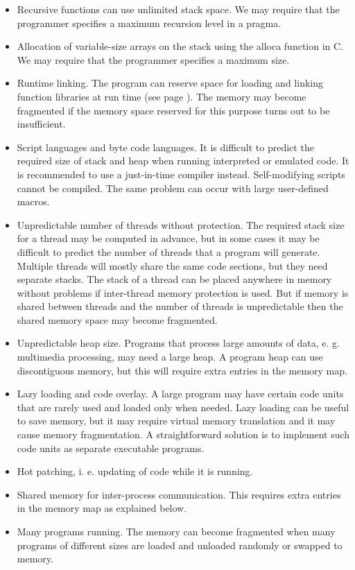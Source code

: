\documentclass[forwardcom.tex]{subfiles}
\begin{document}
\begin{itemize}
\item Recursive functions can use unlimited stack space. We may require that the programmer specifies a maximum recursion level in a pragma.

\item Allocation of variable-size arrays on the stack using the alloca function in C. We may require that the programmer specifies a maximum size. 

\item Runtime linking. The program can reserve space for loading and linking function libraries at run time (see page \pageref{runtimeLinking}). The memory may become fragmented if the memory space reserved for this purpose turns out to be insufficient.

\item Script languages and byte code languages. It is difficult to predict the required size of stack and heap when running interpreted or emulated code. It is recommended to use a just-in-time compiler instead. Self-modifying scripts cannot be compiled. The same problem can occur with large user-defined macros.

\item Unpredictable number of threads without protection. The required stack size for a thread may be computed in advance, but in some cases it may be difficult to predict the number of threads that a program will generate. Multiple threads will mostly share the same code sections, but they need separate stacks. The stack of a thread can be placed anywhere in memory without problems if inter-thread memory protection is used. But if memory is shared between threads and the number of threads is unpredictable then the shared 
memory space may become fragmented. 

\item Unpredictable heap size. Programs that process large amounts of data, e. g. multimedia processing, may need a large heap. A program heap can use discontiguous memory, but this will require extra entries in the memory map. 

\item Lazy loading and code overlay. A large program may have certain code units that are rarely used and loaded only when needed. Lazy loading can be useful to save memory, but it may require virtual memory translation and it may cause memory fragmentation. A straightforward solution is to implement such code units as separate executable programs. 

\item Hot patching, i. e. updating of code while it is running. 

\item Shared memory for inter-process communication. This requires extra entries in the memory map as explained below.

\item Many programs running. The memory can become fragmented when many programs of different sizes are loaded and unloaded randomly or swapped to memory. 
\end{itemize}
\end{document}
